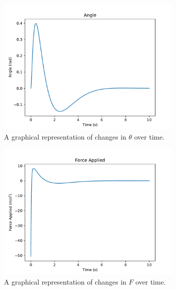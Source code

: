 \documentclass[12pt]{article}
\begin{document}
\begin{figure}[ht]
    \centering
    \includegraphics[width=0.8\textwidth]{angle}
    \caption{\label{angle} A graphical representation of changes in $\theta$ over time.}
\end{figure}

\begin{figure}[ht]
    \centering
    \includegraphics[width=0.8\textwidth]{force}
    \caption{\label{force} A graphical representation of changes in $F$ over time.}
\end{figure}

\printbibliography
\end{document}

